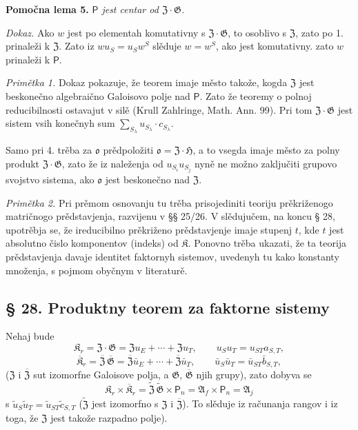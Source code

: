 \documentclass[11pt]{article}
\begin{document}
\noindent\textbf{Pomočna lema 5.} \emph{\(\mathsf{P}\) jest centar od \(\mathfrak Z\cdot\mathfrak G\).}

\noindent\emph{Dokaz.} Ako \(w\) jest po elementah komutativny s \(\mathfrak Z\cdot\mathfrak G\), to osoblivo s \(\mathfrak Z\), zato po 1. prinaleži k \(\mathfrak Z\). Zato iz \(wu_S=u_Sw^S\) slěduje \(w=w^S\), ako jest komutativny. zato \(w\) prinaleži k \(\mathsf{P}\).

\noindent\emph{Primětka 1.} Dokaz pokazuje, že teorem imaje město takože, kogda \(\mathfrak Z\) jest beskonečno algebraično Galoisovo polje nad \(\mathsf{P}\). Zato že teoremy o polnoj reducibilnosti ostavajut v silě (Krull Zahlringe, Math. Ann. 99). Pri tom \(\mathfrak Z\cdot\mathfrak G\) jest sistem vsih konečnyh sum \(\sum_{S_\lambda}u_{S_\lambda}\cdot c_{S_\lambda}\).

Samo pri 4. trěba za \(\mathfrak o\) prědpoložiti \(\mathfrak o=\mathfrak Z\cdot\mathfrak H\), a to vsegda imaje město za polny produkt \(\mathfrak Z\cdot\mathfrak G\), zato že iz naleženja od \(u_{S_i}u_{S_j}\) nyně ne možno zaključiti grupovo svojstvo sistema, ako \(\mathfrak o\) jest beskonečno nad \(\mathfrak Z\).

\noindent\emph{Primětka 2.} Pri prěmom osnovanju tu trěba prisojediniti teoriju prěkriženogo matričnogo prědstavjenja, razvijenu v §§ 25/26. V slědujučem, na koncu § 28, upotrěbja se, že ireducibilno prěkriženo prědstavjenje imaje stupenj \(t\), kde \(t\) jest absolutno čislo komponentov (indeks) od \(\mathfrak K\). Ponovno trěba ukazati, že ta teorija prědstavjenja davaje identitet faktornyh sistemov, uvedenyh tu kako konstanty množenja, s pojmom obyčnym v literaturě.

\subsection*{§ 28. Produktny teorem za faktorne sistemy}\label{produktsatz-fuer-faktorensysteme}

Nehaj bude
\[
\mathfrak K_r=\mathfrak Z\cdot\mathfrak G
=\mathfrak Zu_E+\cdots+\mathfrak Zu_T,
\qquad u_Su_T=u_{ST}a_{S,T},
\]
\[
\overline{\mathfrak K}_r
=\overline{\mathfrak Z}\,\overline{\mathfrak G}
=\overline{\mathfrak Z}\bar u_E+\cdots+\overline{\mathfrak Z}\bar u_T,
\qquad
\bar u_S\bar u_T=\bar u_{ST}\bar b_{S,T},
\]
(\(\mathfrak Z\) i \(\overline{\mathfrak Z}\) sut izomorfne Galoisove polja, a \(\mathfrak G\), \(\overline{\mathfrak G}\) njih grupy), zato dobyva se
\[
\mathfrak K_r\times\overline{\mathfrak K}_r
=\widetilde{\mathfrak Z}\,\widetilde{\mathfrak G}\times \mathsf{P}_n
=\mathfrak A_f\times \mathsf{P}_n
=\mathfrak A_j
\]
s \(\tilde u_S\tilde u_T=\tilde u_{ST}\tilde c_{S,T}\) (\(\widetilde{\mathfrak Z}\) jest izomorfno s \(\mathfrak Z\) i \(\overline{\mathfrak Z}\)). To slěduje iz računanja rangov i iz toga, že \(\mathfrak Z\) jest takože razpadno polje).
\end{document}
